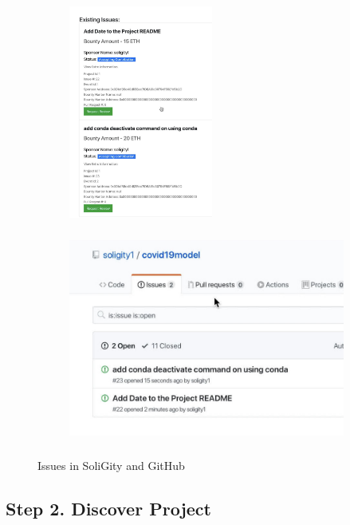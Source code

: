 \documentclass[12pt]{article}
\renewcommand{\_}{\kern-1.5pt\textunderscore\kern-1.5pt}
\begin{document}
\begin{figure}[H]
	\centering
	\begin{subfigure}[b]{.32\textwidth}
		\centering
		\includegraphics[height=7cm]{graphs/28. soligity_issues}
	\end{subfigure}
	\begin{subfigure}[b]{.60\textwidth}
		\centering
		\includegraphics[height=7cm]{graphs/29. github_issues}
	\end{subfigure}

	\caption{Issues in SoliGity and GitHub}
\end{figure}



\subsection{Step 2. Discover Project}
\end{document}
